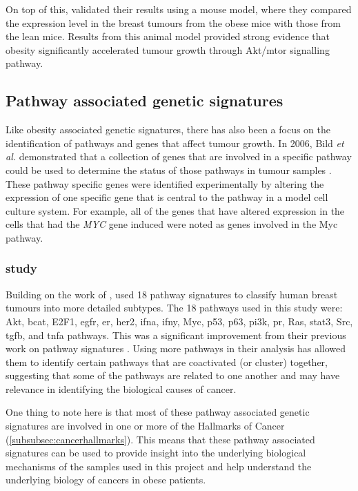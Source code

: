 On top of this, \citet{Fuentes-Mattei2014} validated their results using a mouse model, where they compared the expression level in the breast tumours from the obese mice with those from the lean mice.
Results from this animal model provided strong evidence that obesity significantly accelerated tumour growth through Akt/\gls{mtor} signalling pathway.

\subsection{Pathway associated genetic signatures}
\label{sub:pathway_associated_genetic_signatures}

Like obesity associated genetic signatures, there has also been a focus on the identification of pathways and genes that affect tumour growth.
In 2006, Bild \textit{et al.} demonstrated that a collection of genes that are involved in a specific pathway could be used to determine the status of those pathways in tumour samples \citep{Bild2006}.
These pathway specific genes were identified experimentally by altering the expression of one specific gene that is central to the pathway in a model cell culture system.
For example, all of the genes that have altered expression in the cells that had  the \textit{MYC} gene induced were noted as genes involved in the Myc pathway.

\vspace{-2mm}

\subsubsection{\citet{Gatza2010a} study}
\label{ssub:gatza_study}

Building on the work of \citet{Bild2006}, \citet{Gatza2010a} used 18 pathway signatures to classify human breast tumours into more detailed subtypes.
The 18 pathways used in this study were: Akt, \gls{bcat}, E2F1, \gls{egfr}, \gls{er}, \gls{her2}, \gls{ifna}, \gls{ifny}, Myc, p53, p63, \gls{pi3k}, \gls{pr}, Ras, \gls{stat3}, Src, \gls{tgfb}, and \gls{tnfa} pathways.
This was a significant improvement from their previous work on pathway signatures \citep{Bild2006,Bild2009}.
Using more pathways in their analysis has allowed them to identify certain pathways that are coactivated (or cluster) together, suggesting that some of the pathways are related to one another and may have relevance in identifying the biological causes of cancer.

One thing to note here is that most of these pathway associated genetic signatures are involved in one or more of the Hallmarks of Cancer (\cref{subsubsec:cancerhallmarks}).
This means that these pathway associated signatures can be used to provide insight into the underlying biological mechanisms of the samples used in this project and help understand the underlying biology of cancers in obese patients.

